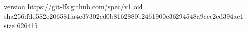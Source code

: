 version https://git-lfs.github.com/spec/v1
oid sha256:fdd582e206581fa4e37302ed0b8162880b2461900c36294548a9cce2ed394ac1
size 626416
